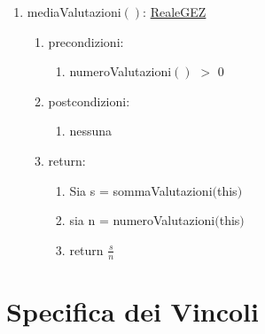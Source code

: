 \documentclass{article}
\begin{document}
\begin{enumerate}
\begin{enumerate}
        \newpage
        \item mediaValutazioni$()$: \hyperref[sec:TipoRealeGEZ]{RealeGEZ}
        \begin{enumerate}
            \item precondizioni:
            \begin{enumerate}
                \item numeroValutazioni$()$ $>$ 0
            \end{enumerate}
            \item postcondizioni:
            \begin{enumerate}
                \item nessuna
            \end{enumerate}
            \item return:
            \begin{enumerate}
                \item Sia s = sommaValutazioni$($this$)$
                \item sia n = numeroValutazioni$($this$)$
                \item return $\frac{s}{n}$
            \end{enumerate}
        \end{enumerate}
    \end{enumerate}
\end{enumerate}

\newpage

\section{\label{sec:Vincoli}Specifica dei Vincoli}
\end{document}
